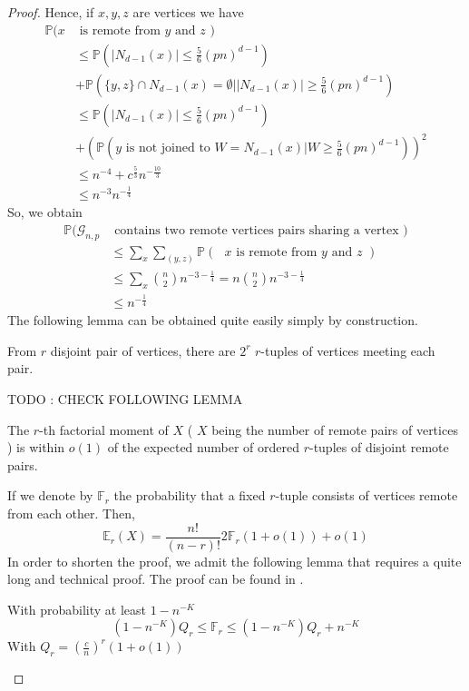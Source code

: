 \begin{proof}
	Hence, if $x, y, z$ are vertices we have
	\begin{align}
		\mathbb{P}(x&\text{ is remote from $y$ and $z$ }) 						\\	
		&\leq \mathbb{P}(|N_{d-1}(x)|\leq \frac{5}{6} (pn)^{d-1}) 					\\
		&+\mathbb{P}(\{y, z\} \cap N_{d-1}(x) = \emptyset | |N_{d-1}(x)| \geq \frac{5}{6}(pn)^{d-1} )	\\
		&\leq \mathbb{P}(|N_{d-1}(x)|\leq \frac{5}{6} (pn)^{d-1}) 					\\				
		&+(\mathbb{P}(\text{$y$ is not joined to } W = N_{d-1}(x) | W \geq \frac{5}{6} (pn)^{d-1}))^2	\\
		&\leq n^{-4} + c^{\frac{5}{3}}n^{-\frac{10}{3}}							\\
		&\leq n^{-3}n^{-\frac{1}{4}}
	\end{align}
	So, we obtain
	\begin{align}
		\mathbb{P}(\mathcal{G}_{n, p} &\text{ contains two remote vertices pairs sharing a vertex })	\\
			&\leq \sum_x\sum_{(y, z)}\mathbb{P}(\text{ $x$ is remote from $y$ and $z$ })		\\
			&\leq \sum_x \binom{n}{2}n^{-3-\frac{1}{4}} = n\binom{n}{2}n^{-3-\frac{1}{4}}		\\
			&\leq n^{-\frac{1}{4}}
	\end{align}
	The following lemma can be obtained quite easily simply by construction.
	\begin{lemma}
		From $r$ disjoint pair of vertices, there are $2^r$ $r$-tuples of vertices meeting each pair.
	\end{lemma}
	TODO : CHECK FOLLOWING LEMMA
	\begin{lemma}
		The $r$-th factorial moment of $X$ ( $X$ being the number of remote pairs of vertices ) is within $o(1)$ of the expected number of ordered $r$-tuples of disjoint remote pairs.
	\end{lemma}
	If we denote by $\mathbb{F}_r$ the probability that a fixed $r$-tuple consists of vertices remote from each other.
	Then,
	\begin{equation}
		\mathbb{E}_r(X) = \frac{n!}{(n-r)!}2\mathbb{F}_r(1+o(1)) + o(1)
	\end{equation}
	In order to shorten the proof, we admit the following lemma that requires a quite long and technical proof. The proof can be found in \cite{Bollob81}.
	\begin{lemma}
		With probability at least $1-n^{-K}$
		\begin{equation}
			(1-n^{-K})Q_r \leq \mathbb{F}_r \leq (1-n^{-K}) Q_r + n^{-K}
		\end{equation}
		With $Q_r = (\frac{c}{n})^r(1+o(1))$
	\end{lemma}


\end{proof}

